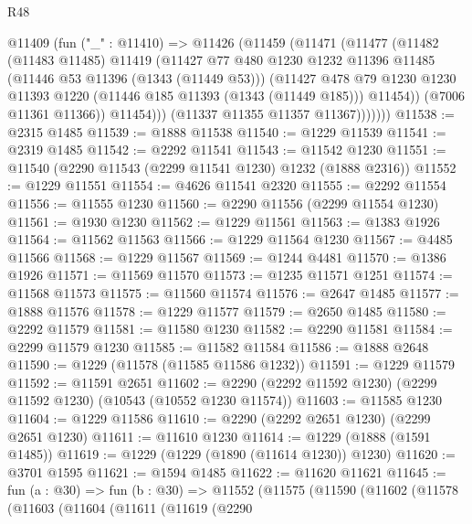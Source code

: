 \begin{lexlean}{R48}
\begin{coremodule}
            @11409
              (fun ("_" : @11410) =>
              @11426
                (@11459
                  (@11471
                    (@11477
                      (@11482
                        (@11483 @11485)
                        @11419
                        (@11427
                          @77
                          @480
                          @1230
                          @1232
                          @11396
                          @11485
                          (@11446 @53 @11396 (@1343 (@11449 @53)))
                          (@11427
                            @478
                            @79
                            @1230
                            @1230
                            @11393
                            @1220
                            (@11446 @185 @11393 (@1343 (@11449 @185)))
                            @11454))
                        (@7006 @11361 @11366))
                      @11454)))
                (@11337 @11355 @11357 @11367)))))))
@11538 := @2315 @1485
@11539 := @1888 @11538
@11540 := @1229 @11539
@11541 := @2319 @1485
@11542 := @2292 @11541
@11543 := @11542 @1230
@11551 := @11540 (@2290 @11543 (@2299 @11541 @1230) @1232 (@1888 @2316))
@11552 := @1229 @11551
@11554 := @4626 @11541 @2320
@11555 := @2292 @11554
@11556 := @11555 @1230
@11560 := @2290 @11556 (@2299 @11554 @1230)
@11561 := @1930 @1230
@11562 := @1229 @11561
@11563 := @1383 @1926
@11564 := @11562 @11563
@11566 := @1229 @11564 @1230
@11567 := @4485 @11566
@11568 := @1229 @11567
@11569 := @1244 @4481
@11570 := @1386 @1926
@11571 := @11569 @11570
@11573 := @1235 @11571 @1251
@11574 := @11568 @11573
@11575 := @11560 @11574
@11576 := @2647 @1485
@11577 := @1888 @11576
@11578 := @1229 @11577
@11579 := @2650 @1485
@11580 := @2292 @11579
@11581 := @11580 @1230
@11582 := @2290 @11581
@11584 := @2299 @11579 @1230
@11585 := @11582 @11584
@11586 := @1888 @2648
@11590 := @1229 (@11578 (@11585 @11586 @1232))
@11591 := @1229 @11579
@11592 := @11591 @2651
@11602 := @2290 (@2292 @11592 @1230) (@2299 @11592 @1230) (@10543 (@10552 @1230 @11574))
@11603 := @11585 @1230
@11604 := @1229 @11586
@11610 := @2290 (@2292 @2651 @1230) (@2299 @2651 @1230)
@11611 := @11610 @1230
@11614 := @1229 (@1888 (@1591 @1485))
@11619 := @1229 (@1229 (@1890 (@11614 @1230)) @1230)
@11620 := @3701 @1595
@11621 := @1594 @1485
@11622 := @11620 @11621
@11645 := fun (a : @30) =>
  fun (b : @30) =>
  @11552
    (@11575
      (@11590
        (@11602
          (@11578
            (@11603
              (@11604
                (@11611
                  (@11619
                    (@2290

\end{coremodule}
\end{lexlean}
